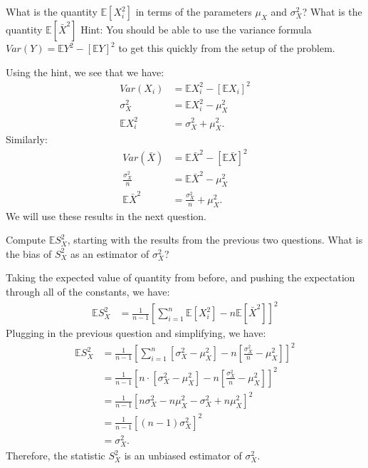 
What is the quantity $\mathbb{E}[X_i^2]$ in terms of the parameters $\mu_X$ and
$\sigma_X^2$? What is the quantity $\mathbb{E}[\bar{X}^2]$ Hint: You should be
able to use the variance formula $Var(Y) = \mathbb{E}Y^2 - [\mathbb{E}Y]^2$
to get this quickly from the setup of the problem.


Using the hint, we see that we have:
\begin{align*}
Var(X_i) &= \mathbb{E}X_i^2 - [\mathbb{E}X_i]^2 \\
\sigma_X^2 &= \mathbb{E}X_i^2 - \mu_X^2 \\
\mathbb{E}X_i^2 &= \sigma_X^2 + \mu_X^2.
\end{align*}
Similarly:
\begin{align*}
Var(\bar{X}) &= \mathbb{E}\bar{X}^2 - [\mathbb{E}\bar{X}]^2 \\
\frac{\sigma_X^2}{n}  &= \mathbb{E}\bar{X}^2 - \mu_X^2 \\
\mathbb{E}\bar{X}^2 &= \frac{\sigma_X^2}{n} + \mu_X^2.
\end{align*}
We will use these results in the next question.


Compute $\mathbb{E}S_X^2$, starting with the results from the previous two
questions. What is the bias of $S_X^2$ as an estimator of $\sigma_X^2$?


Taking the expected value of quantity from before, and pushing the expectation
through all of the constants, we have:
\begin{align*}
\mathbb{E} S^2_X &= \frac{1}{n-1} \left[ \sum_{i=1}^n \mathbb{E} [X_i^2] - n \mathbb{E}[\bar{X}^2] \right]^2
\end{align*}
Plugging in the previous question and simplifying, we have:
\begin{align*}
\mathbb{E} S^2_X &= \frac{1}{n-1} \left[ \sum_{i=1}^n \left[ \sigma_X^2 - \mu_X^2 \right] -
  n \left[ \frac{\sigma_X^2}{n} - \mu_X^2 \right] \right]^2 \\
&= \frac{1}{n-1} \left[ n \cdot \left[ \sigma_X^2 - \mu_X^2 \right] -
  n \left[ \frac{\sigma_X^2}{n} - \mu_X^2 \right] \right]^2 \\
&= \frac{1}{n-1} \left[ n \sigma_X^2 - n \mu_X^2 - \sigma_X^2 + n \mu_X^2  \right]^2 \\
&= \frac{1}{n-1} \left[ (n-1) \sigma_X^2 \right]^2 \\
&= \sigma_X^2.
\end{align*}
Therefore, the statistic $S_X^2$ is an unbiased estimator of $\sigma_X^2$.

